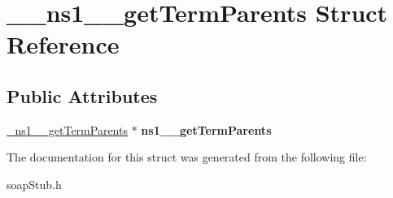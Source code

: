 \hypertarget{struct____ns1____getTermParents}{
\section{\_\-\_\-ns1\_\-\_\-getTermParents Struct Reference}
\label{struct____ns1____getTermParents}
}
\subsection*{Public Attributes}
\begin{DoxyCompactItemize}
\item 
\hypertarget{struct____ns1____getTermParents_a5c5379c9b45b0fb41c9c2b66d822fcb6}{
\hyperlink{class__ns1____getTermParents}{\_\-ns1\_\-\_\-getTermParents} $\ast$ {\bfseries ns1\_\-\_\-getTermParents}}
\label{struct____ns1____getTermParents_a5c5379c9b45b0fb41c9c2b66d822fcb6}

\end{DoxyCompactItemize}


The documentation for this struct was generated from the following file:\begin{DoxyCompactItemize}
\item 
soapStub.h\end{DoxyCompactItemize}
